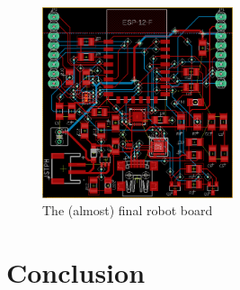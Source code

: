 \documentclass[11pt]{ieeeconf}
\begin{document}
\begin{figure}[h]
\centering
\captionsetup{justification=centering}
\includegraphics[width=0.5\textwidth]{images/RobotBoard.png}
\caption{The (almost) final robot board}
\label{roboboard}
\end{figure}

\section{Conclusion}



\end{document}
